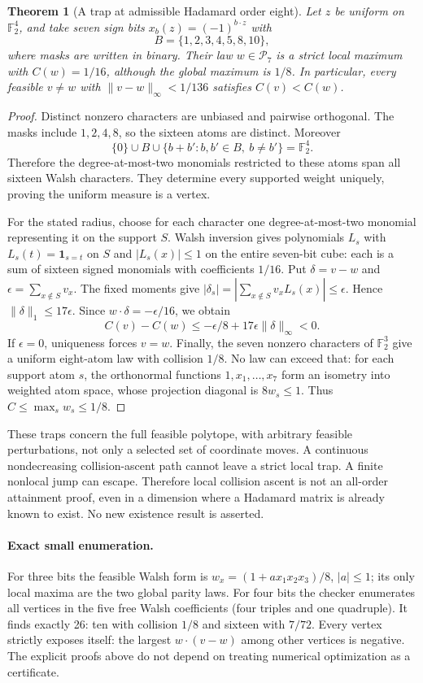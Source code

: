 \documentclass[11pt]{article}
\newtheorem{theorem}{Theorem}[section]
\begin{document}
\begin{theorem}[A trap at admissible Hadamard order eight]
\label{thm:attainment-admissible-trap}
Let $z$ be uniform on $\mathbb F_2^4$, and take seven sign bits
$x_b(z)=(-1)^{b\cdot z}$ with
\[
 B=\{1,2,3,4,5,8,10\},
\]
where masks are written in binary. Their law $w\in\mathcal P_7$ is
a strict local maximum with $C(w)=1/16$, although the global maximum
is $1/8$. In particular, every feasible $v\ne w$ with
$\|v-w\|_\infty<1/136$ satisfies $C(v)<C(w)$.
\end{theorem}
\begin{proof}
Distinct nonzero characters are unbiased and pairwise orthogonal.
The masks include $1,2,4,8$, so the sixteen atoms are distinct.
Moreover
\[
 \{0\}\cup B\cup\{b+b':b,b'\in B,\ b\ne b'\}
 =\mathbb F_2^4.
\]
Therefore the degree-at-most-two monomials restricted to these atoms
span all sixteen Walsh characters. They determine every supported
weight uniquely, proving the uniform measure is a vertex.

For the stated radius, choose for each character one degree-at-most-two
monomial representing it on the support $S$. Walsh inversion gives
polynomials $L_s$ with $L_s(t)=\mathbf1_{s=t}$ on $S$ and
$|L_s(x)|\le1$ on the entire seven-bit cube: each is a sum of sixteen
signed monomials with coefficients $1/16$.
Put $\delta=v-w$ and $\epsilon=\sum_{x\notin S}v_x$.
The fixed moments give
$|\delta_s|=|\sum_{x\notin S}v_xL_s(x)|\le\epsilon$.
Hence $\|\delta\|_1\le17\epsilon$. Since
$w\cdot\delta=-\epsilon/16$, we obtain
\[
 C(v)-C(w)\le-\epsilon/8+
             17\epsilon\|\delta\|_\infty<0.
\]
If $\epsilon=0$, uniqueness forces $v=w$.
Finally, the seven nonzero characters of $\mathbb F_2^3$ give a
uniform eight-atom law with collision $1/8$. No law can exceed that:
for each support atom $s$, the orthonormal functions $1,x_1,\ldots,x_7$
form an isometry into weighted atom space, whose projection diagonal
is $8w_s\le1$. Thus $C\le\max_s w_s\le1/8$.
\end{proof}
These traps concern the full feasible polytope, with arbitrary feasible
perturbations, not only a selected set of coordinate moves. A continuous
nondecreasing collision-ascent path cannot leave a strict local trap.
A finite nonlocal jump can escape. Therefore local collision ascent is
not an all-order attainment proof, even in a dimension where a Hadamard
matrix is already known to exist. No new existence result is asserted.

\paragraph{Exact small enumeration.}
For three bits the feasible Walsh form is
$w_x=(1+a x_1x_2x_3)/8$, $|a|\le1$; its only local maxima are the two
global parity laws. For four bits the checker enumerates all vertices
in the five free Walsh coefficients (four triples and one quadruple).
It finds exactly 26: ten with collision $1/8$ and sixteen with $7/72$.
Every vertex strictly exposes itself: the largest $w\cdot(v-w)$ among
other vertices is negative. The explicit proofs above do not depend
on treating numerical optimization as a certificate.
\end{document}
